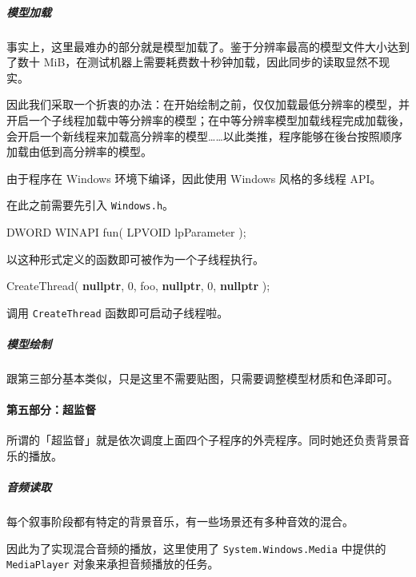 \documentclass[
]{article}
\newenvironment{Shaded}{}{}
\newcommand{\DecValTok}[1]{\textcolor[rgb]{0.25,0.63,0.44}{#1}}
\newcommand{\KeywordTok}[1]{\textcolor[rgb]{0.00,0.44,0.13}{\textbf{#1}}}
\newcommand{\NormalTok}[1]{#1}
\begin{document}
\hypertarget{header-n293}{%
\subparagraph{模型加载}\label{header-n293}}

事实上，这里最难办的部分就是模型加载了。鉴于分辨率最高的模型文件大小达到了数十
MiB，在测试机器上需要耗费数十秒钟加载，因此同步的读取显然不现实。

因此我们采取一个折衷的办法：在开始绘制之前，仅仅加载最低分辨率的模型，并开启一个子线程加载中等分辨率的模型；在中等分辨率模型加载线程完成加载後，会开启一个新线程来加载高分辨率的模型\ldots\ldots 以此类推，程序能够在後台按照顺序加载由低到高分辨率的模型。

由于程序在 Windows 环境下编译，因此使用 Windows 风格的多线程 API。

在此之前需要先引入 \texttt{Windows.h}。

\begin{Shaded}
\begin{Highlighting}[]
\NormalTok{DWORD WINAPI fun( LPVOID lpParameter );}
\end{Highlighting}
\end{Shaded}

以这种形式定义的函数即可被作为一个子线程执行。

\begin{Shaded}
\begin{Highlighting}[]
\NormalTok{CreateThread( }\KeywordTok{nullptr}\NormalTok{, }\DecValTok{0}\NormalTok{, foo, }\KeywordTok{nullptr}\NormalTok{, }\DecValTok{0}\NormalTok{, }\KeywordTok{nullptr}\NormalTok{ );}
\end{Highlighting}
\end{Shaded}

调用 \texttt{CreateThread} 函数即可启动子线程啦。

\hypertarget{header-n313}{%
\subparagraph{模型绘制}\label{header-n313}}

跟第三部分基本类似，只是这里不需要贴图，只需要调整模型材质和色泽即可。

\hypertarget{header-n316}{%
\paragraph{第五部分：超监督}\label{header-n316}}

所谓的「超监督」就是依次调度上面四个子程序的外壳程序。同时她还负责背景音乐的播放。

\hypertarget{header-n320}{%
\subparagraph{音频读取}\label{header-n320}}

每个叙事阶段都有特定的背景音乐，有一些场景还有多种音效的混合。

因此为了实现混合音频的播放，这里使用了 \texttt{System.Windows.Media}
中提供的 \texttt{MediaPlayer} 对象来承担音频播放的任务。
\end{document}
